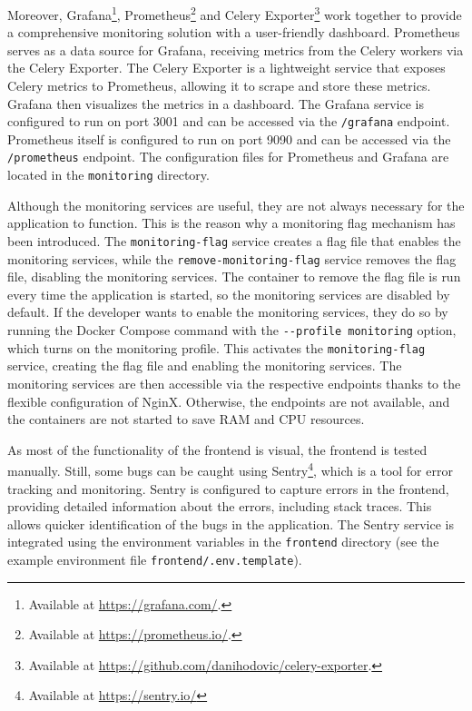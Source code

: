 Moreover, Grafana\footnote{Available at \url{https://grafana.com/}.}, Prometheus\footnote{Available at \url{https://prometheus.io/}.} and Celery Exporter\footnote{Available at \url{https://github.com/danihodovic/celery-exporter}.} work together to provide a comprehensive monitoring solution with a user-friendly dashboard. Prometheus serves as a data source for Grafana, receiving metrics from the Celery workers via the Celery Exporter. The Celery Exporter is a lightweight service that exposes Celery metrics to Prometheus, allowing it to scrape and store these metrics. Grafana then visualizes the metrics in a dashboard. The Grafana service is configured to run on port 3001 and can be accessed via the \lstinline!/grafana! endpoint. Prometheus itself is configured to run on port 9090 and can be accessed via the \lstinline!/prometheus! endpoint. The configuration files for Prometheus and Grafana are located in the \lstinline!monitoring! directory.

Although the monitoring services are useful, they are not always necessary for the application to function. This is the reason why a monitoring flag mechanism has been introduced. The \lstinline!monitoring-flag! service creates a flag file that enables the monitoring services, while the \lstinline!remove-monitoring-flag! service removes the flag file, disabling the monitoring services. The container to remove the flag file is run every time the application is started, so the monitoring services are disabled by default. If the developer wants to enable the monitoring services, they do so by running the Docker Compose command with the \lstinline|--profile monitoring| option, which turns on the monitoring profile. This activates the \lstinline!monitoring-flag! service, creating the flag file and enabling the monitoring services. The monitoring services are then accessible via the respective endpoints thanks to the flexible configuration of NginX. Otherwise, the endpoints are not available, and the containers are not started to save RAM and CPU resources.

As most of the functionality of the frontend is visual, the frontend is tested manually. Still, some bugs can be caught using Sentry\footnote{Available at \url{https://sentry.io/}}, which is a tool for error tracking and monitoring. Sentry is configured to capture errors in the frontend, providing detailed information about the errors, including stack traces. This allows quicker identification of the bugs in the application. The Sentry service is integrated using the environment variables in the \lstinline|frontend| directory (see the example environment file \lstinline!frontend/.env.template!).

